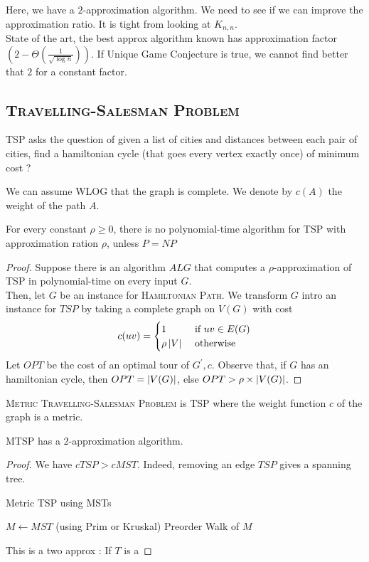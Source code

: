 \documentclass{cours}
\begin{document}
Here, we have a $2$-approximation algorithm. We need to see if we can improve the approximation ratio. It is tight from looking at $K_{n, n}$. \\
State of the art, the best approx algorithm known has approximation factor $\left(2 - \Theta\left(\frac{1}{\sqrt{\log n}}\right)\right)$. If Unique Game Conjecture is true, we cannot find better that $2$ for a constant factor. 

\subsection{\textsc{Travelling-Salesman Problem}}
\begin{definition}
    TSP asks the question of given a list of cities and distances between each pair of cities, find a hamiltonian cycle (that goes every vertex exactly once) of minimum cost ?
\end{definition}

We can assume WLOG that the graph is complete. We denote by $c(A)$ the weight of the path $A$. \\
\begin{theorem}
    For every constant $\rho \geq 0$, there is no polynomial-time algorithm for TSP with approximation ration $\rho$, unless $P = NP$
\end{theorem}
\begin{proof}
    Suppose there is an algorithm $ALG$ that computes a $\rho$-approximation of TSP in polynomial-time on every input $G$.\\
    Then, let $G$ be an instance for \textsc{Hamiltonian Path}. We transform $G$ intro an instance for $TSP$ by taking a complete graph on $V(G)$ with cost \[c(uv) = \begin{cases}
        1 & \text{ if } uv\in E(G)\\
        \rho\left|V\right| &\text{ otherwise}
    \end{cases}\]
    Let $OPT$ be the cost of an optimal tour of $G^{'}, c$. Observe that, if $G$ has an hamiltonian cycle, then $OPT = \left|V(G)\right|$, else $OPT > \rho \times \left|V(G)\right|$.
\end{proof}

\begin{definition}
    \textsc{Metric Travelling-Salesman Problem} is \textsc{TSP} where the weight function $c$ of the graph is a metric. 
\end{definition}

\begin{theorem}
    \textsc{MTSP} has a $2$-approximation algorithm. 
\end{theorem}
\begin{proof}
    We have $c{TSP} > c{MST}$. Indeed, removing an edge $TSP$ gives a spanning tree.
    \begin{algorithm}
        \caption{Metric TSP using MSTs}
        \begin{algorithmic}
            \State $M \gets MST$ (using Prim or Kruskal)
            \State\Return Preorder Walk of $M$
        \end{algorithmic}
    \end{algorithm}
    This is a two approx : If $T$ is a 
\end{proof}
\end{document}
